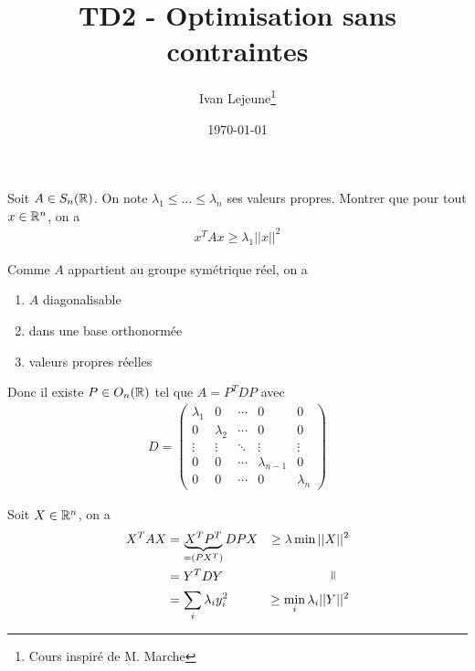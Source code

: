 \documentclass[french,a4paper,10pt]{article}
\title{\color{astral} \sffamily \bfseries TD2 - Optimisation sans contraintes}
\author{Ivan Lejeune\thanks{Cours inspiré de M. Marche}}
\date{\today}
\begin{document}
	\maketitle
	\begin{td-exo}[1]
		Soit $A\in S_n(\mathbb{R})$. On note $\lambda_1\le\dots\le\lambda_n$ ses valeurs propres. Montrer que pour tout $x\in\mathbb{R}^n$, on a
			\[\begin{aligned}
				x^TAx\ge \lambda_1||x||^2
			\end{aligned}\]
	\end{td-exo}
	\begin{td-sol}
		Comme $A$ appartient au groupe symétrique réel, on a
			\begin{enumerate}
				\item $A$ diagonalisable
				\item dans une base orthonormée
				\item valeurs propres réelles
			\end{enumerate}
			Donc il existe $P\in O_n(\mathbb{R})$ tel que $A=P^TDP$ avec
				\[\begin{aligned}
					D = \begin{pmatrix}
						\lambda_1&0&\cdots&0&0\\
						0&\lambda_2&\cdots&0&0\\
						\vdots&\vdots&\ddots&\vdots&\vdots\\
						0&0&\cdots&\lambda_{n-1}&0\\
						0&0&\cdots&0&\lambda_n
					\end{pmatrix}
				\end{aligned}\]
				
			Soit $X\in \mathbb{R}^n$, on a
				\[\begin{aligned}
					X^TAX&=\underbrace{X^TP^T}_{=(PX^T)}DPX&\ge \lambda \min ||X||^2\\
					&=Y^TDY&\rotatebox{90}=\quad\\
					&=\sum_{i}\lambda_i y_i^2&\ge \min_i \lambda_i ||Y||^2
				\end{aligned}\]
	\end{td-sol}
	\medspace
\end{document}
